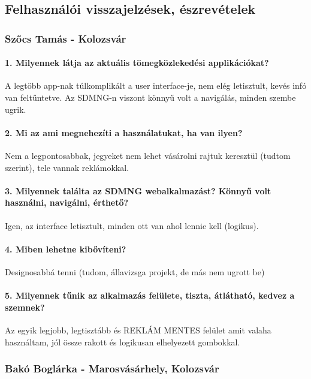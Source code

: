 \subsection{Felhasználói visszajelzések, észrevételek}

\subsubsection{Szőcs Tamás - Kolozsvár}
\paragraph*{1. Milyennek látja az aktuális tömegközlekedési applikációkat?} 
A legtöbb app-nak túlkomplikált a user interface-je, nem elég letisztult, kevés infó van feltűntetve. Az SDMNG-n viszont könnyű volt a navigálás, minden szembe ugrik.

\paragraph*{2. Mi az ami megnehezíti a használatukat, ha van ilyen?} 
Nem a legpontosabbak, jegyeket nem lehet vásárolni rajtuk keresztül (tudtom szerint), tele vannak reklámokkal.

\paragraph*{3. Milyennek találta az SDMNG webalkalmazást? Könnyű volt használni, navigálni, érthető?} 
Igen, az interface letisztult, minden ott van ahol lennie kell (logikus).

\paragraph*{4. Miben lehetne kibővíteni?}
Designosabbá tenni (tudom, állavizsga projekt, de más nem ugrott be)

\paragraph*{5. Milyennek tűnik az alkalmazás felülete, tiszta, átlátható, kedvez a szemnek?}
Az egyik legjobb, legtisztább és REKLÁM MENTES felület amit valaha használtam, jól össze rakott és logikusan elhelyezett gombokkal.

\subsubsection{Bakó Boglárka - Marosvásárhely, Kolozsvár}

